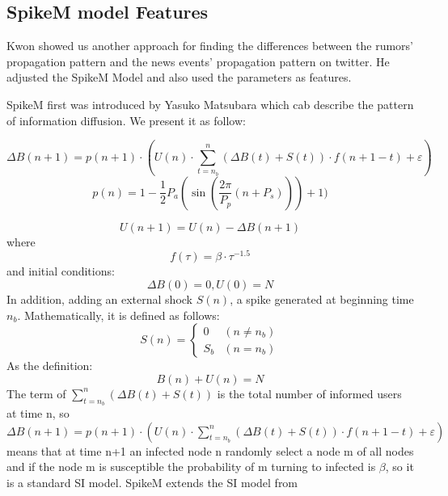 \clearpage
\subsection{SpikeM model Features}
Kwon showed us another approach \cite{kwon2013prominent}  for finding the differences between the rumors' propagation pattern and the news events' propagation pattern on twitter. He adjusted the SpikeM Model and also used the parameters as features. 

SpikeM first was introduced by Yasuko Matsubara \cite{conf/kdd/MatsubaraSPLF12} which cab describe the pattern of information diffusion. We present it as follow:

\begin{equation}
\Delta B(n + 1) =p(n + 1)\cdot( U(n) \cdot  \sum ^n_{t=n_b}(\Delta B(t) + S(t))\cdot f(n+1-t) + \varepsilon )
\end{equation}
\begin{equation}
\label{periodic}
p(n) = 1-\frac{1}{2}P_a(\sin (\frac{2\pi}{P_p} (n+P_s)))+1)
\end{equation}

\begin{equation}
U(n + 1)=U(n)-\Delta {B(n + 1) }
\end{equation}
where
\begin{equation}
\label{decay}
f(\tau)=\beta \cdot \tau ^{-1.5}
\end{equation}
and initial conditions:
\begin{equation}
 \Delta B(0)=0 ,U(0) = N
\end{equation}
In addition, adding an external shock $S(n)$, a spike generated
at beginning time $n_b$. Mathematically, it is defined as follows:
\begin{equation}
\label{outs}
S(n) =\begin{cases}0 &(n \neq n_b)\\S_b  & (n =n_b)\end{cases} 
\end{equation}
As the definition: 
\begin{equation}
B(n) + U(n) = N
\end{equation}
The term of $\sum ^n_{t=n_b}(\Delta B(t) + S(t))$ is the total number of informed users at time n, so $\Delta B(n + 1) =p(n + 1)\cdot( U(n) \cdot  \sum ^n_{t=n_b}(\Delta B(t) + S(t))\cdot f(n+1-t) + \varepsilon )$ means that at time n+1 an infected node n randomly select a node m of all nodes and if the node m is susceptible the probability of m turning to infected is $\beta$, so it is a standard SI model. SpikeM extends the SI model from 


